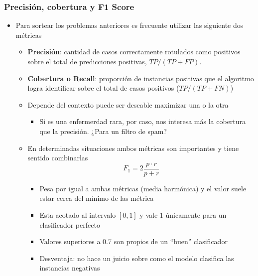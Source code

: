 \documentclass[leqno, 10pt, envcountsect]{beamer}
\numberwithin{equation}{section}
\theoremstyle{definition}
\theoremstyle{example}
\numberwithin{figure}{section}
\numberwithin{table}{section}
\let\olditem\item
\renewcommand{\item}{%
\olditem\vspace{1pt}}
\begin{document}
\begin{frame}[fragile=singleslide]
  \frametitle{Precisión, cobertura y F1 Score}
  \begin{itemize}
    \item Para sortear los problemas anteriores es frecuente utilizar las
      siguiente dos métricas
      \begin{itemize}
        \item \textbf{Precisión}: cantidad de casos correctamente rotulados
          como positivos sobre el total de predicciones positivas, $TP / (TP +
          FP)$.
        \item \textbf{Cobertura o Recall}: proporción de instancias positivas
          que el algoritmo logra identificar sobre el total de casos positivos
          ($TP / (TP + FN)$)
        \item Depende del contexto puede ser deseable maximizar una o la otra
          \begin{itemize}
            \item Si es una enfermerdad rara, por caso, nos interesa más la
              cobertura que la precisión. ¿Para un filtro de spam?
          \end{itemize}
      \end{itemize}
      \begin{itemize}
        \item En determinadas situaciones ambos métricas son importantes y
          tiene sentido combinarlas
          \begin{equation*}
            F_{1} = 2\frac{p\cdot r}{p + r}
          \end{equation*}
          \begin{itemize}
            \item Pesa por igual a ambas métricas (media harmónica) y el
              valor suele estar cerca del mínimo de las métrica
            \item Esta acotado al intervalo $[0, 1]$ y vale 1 únicamente para
              un clasificador perfecto
            \item Valores superiores a 0.7 son propios de un \enquote{buen}
              clasificador
            \item Desventaja: no hace un juicio sobre como el modelo clasifica
              las instancias negativas
          \end{itemize}
      \end{itemize}
  \end{itemize}
\end{frame}
\end{document}
